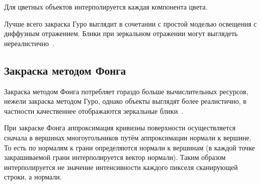 Для цветных объектов интерполируется каждая компонента цвета.

Лучше всего закраска Гуро выглядит в сочетании с простой моделью освещения с диффузным отражением. Блики при зеркальном отражении могут выглядеть нереалистично~\cite{rodjers, light}.

\subsection{Закраска методом Фонга}

Закраска методом Фонга потребляет гораздо больше вычислительных ресурсов, нежели закраска методом Гуро, однако объекты выглядят более реалистично, в частности качественнее отображаются зеркальные блики~\cite{light}.

При закраске Фонга аппроксимация кривизны поверхности осуществляется сначала в вершинах многоугольников путём аппроксимации нормали к вершине. То есть по нормалям к грани определяются нормали к вершинам (в каждой точке закрашиваемой грани интерполируется вектор нормали). Таким образом интерполируется не значение интенсивности каждого пикселя сканирующей строки, а нормали.

